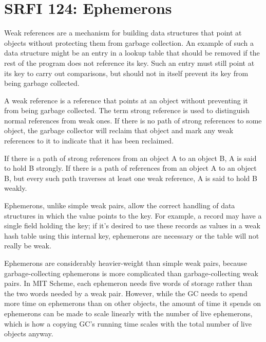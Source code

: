 \section{SRFI 124: Ephemerons}

Weak references are a mechanism for building data structures that point
at objects without protecting them from garbage collection. An example
of such a data structure might be an entry in a lookup table that should
be removed if the rest of the program does not reference its key. Such
an entry must still point at its key to carry out comparisons, but
should not in itself prevent its key from being garbage collected.

A weak reference is a reference that points at an object without
preventing it from being garbage collected. The term strong reference is
used to distinguish normal references from weak ones. If there is no
path of strong references to some object, the garbage collector will
reclaim that object and mark any weak references to it to indicate that
it has been reclaimed.

If there is a path of strong references from an object A to an object B,
A is said to hold B strongly. If there is a path of references from an
object A to an object B, but every such path traverses at least one weak
reference, A is said to hold B weakly.

Ephemerons, unlike simple weak pairs, allow the correct handling of data
structures in which the value points to the key. For example, a record
may have a single field holding the key; if it's desired to use these
records as values in a weak hash table using this internal key,
ephemerons are necessary or the table will not really be weak.

Ephemerons are considerably heavier-weight than simple weak pairs,
because garbage-collecting ephemerons is more complicated than
garbage-collecting weak pairs. In MIT Scheme, each ephemeron needs five
words of storage rather than the two words needed by a weak pair.
However, while the GC needs to spend more time on ephemerons than on
other objects, the amount of time it spends on ephemerons can be made to
scale linearly with the number of live ephemerons, which is how a
copying GC's running time scales with the total number of live objects
anyway.

